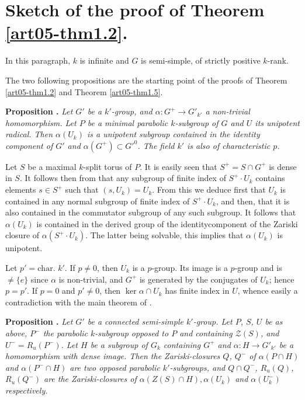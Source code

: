 \section{Sketch of the proof of Theorem \ref{art05-thm1.2}.}\label{art05-sec3}

In this paragraph, $k$ is infinite and $G$ is semi-simple, of strictly positive $k$-rank.

The two following propositions are the starting point of the proofs of Theorem \ref{art05-thm1.2} and Theorem \ref{art05-thm1.5}.

\medskip
\noindent
{\bf Proposition .\label{art05-prop3.1}}
{\em Let $G'$ be a $k'$-group, and $\alpha:G^{+}\to G'_{k'}$ a non-trivial homomorphism. Let $P$ be a minimal parabolic $k$-subgroup of $G$ and $U$ its unipotent radical. Then $\alpha(U_{k})$ is a unipotent subgroup contained in the identity component of $G'$ and $\alpha(G^{+})\subset {G'}^{0}$. The field $k'$ is also of characteristic $p$.}
\smallskip

Let $S$ be a maximal $k$-split torus of $P$. It is easily seen that $S^{+}=S\cap G^{+}$ is dense in $S$. It follows then from \cite[\S11.1]{art05-key1} that any subgroup of finite index of $S^{+}\cdot U_{k}$ contains elements $s\in S^{+}$ such that $(s,U_{k})=U_{k}$. From this we deduce first that $U_{k}$ is contained in any normal subgroup of finite index of $S^{+}\cdot U_{k}$, and then, that it is also contained in the commutator subgroup of any such subgroup. It follows that $\alpha(U_{k})$ is contained in the derived group of the identity\pageoriginale component of the Zariski closure of $\alpha(S^{+}\cdot U_{k})$. The latter being solvable, this implies that $\alpha(U_{k})$ is unipotent.

Let $p'=\text{char.~} k'$. If $p\neq 0$, then $U_{k}$ is a $p$-group. Its image is a $p$-group and is $\neq \{e\}$ since $\alpha$ is non-trivial, and $G^{+}$ is generated by the conjugates of $U_{k}$; hence $p=p'$. If $p=0$ and $p'\neq 0$, then $\ker \alpha\cap U_{k}$ has finite index in $U$, whence easily a contradiction with the main theorem of \cite{art05-key10}.

\medskip
\noindent
{\bf Proposition .\label{art05-prop3.2}}
{\em Let $G'$ be a connected semi-simple $k'$-group. Let $P$, $S$, $U$ be as above, $P^{-}$ the parabolic $k$-subgroup opposed to $P$ and containing $\mathscr{Z}(S)$, and $U^{-}=R_{u}(P^{-})$. Let $H$ be a subgroup of $G_{k}$ containing $G^{+}$ and $\alpha : H\to G'_{k'}$ be a homomorphism with dense image. Then the Zariski-closures $Q$, $Q^{-}$ of $\alpha(P\cap H)$ and $\alpha(P^{-}\cap H)$ are two opposed parabolic $k'$-subgroups, and $Q\cap Q^{-}$, $R_{u}(Q)$, $R_{u}(Q^{-})$ are the Zariski-closures of $\alpha(Z(S)\cap H),\alpha(U_{k})$ and $\alpha(U^{-}_{k})$ respectively.}
\smallskip

